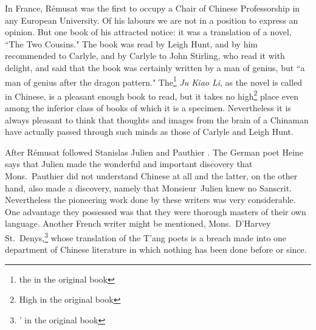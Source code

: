 In France, R\'emusat  was the first to occupy a Chair of Chinese Professorship in any European University.
Of his labours we are not in a position to express an opinion.
But one book of his attracted notice: it was a translation of a novel, ``The Two Cousins."
The book was read by Leigh Hunt, and by him recommended to Carlyle, and by Carlyle to John Stirling, who read it with delight, and said that the book was certainly written by a man of genius, but ``a man of genius after the dragon pattern."
The\footnote{the in the original book} \emph{Ju Kiao Li}, as the novel is called in Chinese, is a pleasant enough book to read, but it takes no high\footnote{High in the original book} place even among the inferior class of books of which it is a specimen.
Nevertheless it is always pleasant to think that thoughts and images from the brain of a Chinaman have actually passed through such minds as those of Carlyle and Leigh Hunt.

After R\'emusat followed Stanislas Julien  and Pauthier .
The German poet Heine says that Julien made the wonderful and important discovery that Mons.~Pauthier  did not understand Chinese at all and the latter, on the other hand, also made a discovery, namely that Monsieur~Julien knew no Sanscrit. 
Nevertheless the pioneering work done by these writers was very considerable.
One advantage they possessed was that they were thorough masters of their own language.
Another French writer might be mentioned, Mons.~D'Harvey St.~Denys,\footnote{' in the original book}   whose translation of the T'ang poets is a breach made into one department of Chinese literature in which nothing has been done before or since.

